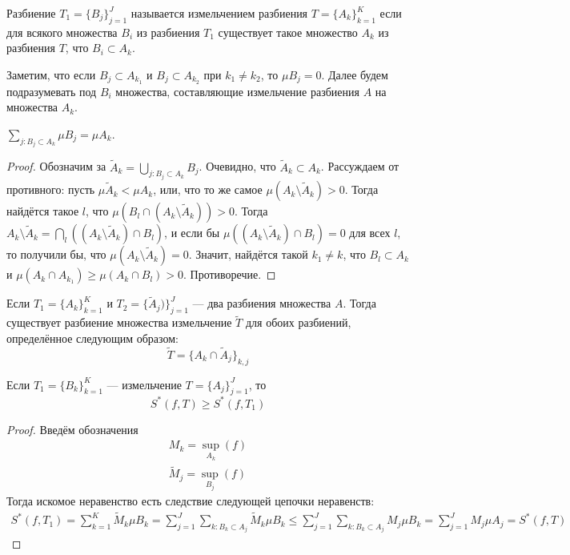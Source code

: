 \begin{Def}
    Разбиение $T_1 = \{B_j\}_{j =1}^{J}$ называется измельчением разбиения $T = \{A_k\}_{k=1}^{K}$ если для всякого множества $B_i$ из разбиения $T_1$ существует такое множество $A_k$ из разбиения $T$, что $B_i \subset A_k$. 
\end{Def}
Заметим, что если $B_j \subset A_{k_1}$ и $B_j \subset A_{k_2}$ при $k_1 \neq k_2$, то $\mu B_j = 0$. Далее будем подразумевать под $B_i$ множества, составляющие измельчение разбиения $A$ на множества $A_k$. 
\begin{Statement}
    $\sum \limits_{j\colon B_j \subset A_k}\mu B_j = \mu A_k$.
\end{Statement}
\begin{proof}
    Обозначим за $\widetilde{A}_k = \bigcup\limits_{j\colon B_j \subset A_k}B_j$. Очевидно, что $\widetilde{A}_k \subset A_k$. Рассуждаем от противного: пусть $\mu \widetilde{A}_k < \mu A_k$, или, что то же самое $ \mu(A_k\setminus \widetilde{A}_k ) > 0$. Тогда найдётся такое $l$, что $\mu (B_l \cap (A_k \setminus \widetilde{A}_k)) > 0$. Тогда $A_k \setminus \widetilde{A}_k = \bigcap\limits_{l}((A_k \setminus \widetilde{A}_k)\cap B_l)$, и если бы $\mu((A_k \setminus \widetilde{A}_k)\cap B_l) = 0$ для всех $l$, то получили бы, что $\mu(A_k \setminus \widetilde{A}_k) = 0$. Значит, найдётся такой $k_1 \neq k$, что $B_l \subset A_k$ и $\mu(A_k \cap A_{k_1}) \geqslant \mu(A_k \cap B_l) > 0$. Противоречие.
\end{proof}
Если $T_1 = \{A_k\}_{k =1}^{K}$ и $T_2 = \{\widetilde{A}_j)\}_{j=1}^{J}$ --- два разбиения множества $A$. Тогда существует разбиение множества измельчение $\widetilde{T}$ для обоих разбиений, определённое следующим образом:
$$
    \widetilde{T} =  \{A_k \cap \widetilde{A}_j\}_{k, j}
$$
\begin{Lemma}
    Если $T_1 = \{B_k\}_{k=1}^{K}$ --- измельчение $T = \{A_j\}_{j =1}^{J}$, то 
    $$
        S^* (f, T) \geqslant S^*(f, T_1)
    $$
\end{Lemma}
\begin{proof}
    Введём обозначения
    \begin{gather}
        M_k = \sup_{A_k}(f)\\
        \widetilde{M}_j = \sup_{B_j}(f)
    \end{gather}
    Тогда искомое неравенство есть следствие следующей цепочки неравенств:
    \begin{gather}
        S^*(f, T_1) = \sum\limits_{k = 1}^{K}\widetilde{M}_k\mu B_k =  \sum\limits_{j = 1}^{J} \sum\limits_{k\colon B_k \subset A_j} \widetilde{M}_k \mu B_k \leqslant \sum\limits_{j=1}^J  \sum\limits_{k\colon B_k \subset A_j} M_j \mu B_k = \sum\limits_{j=1}^J M_j \mu A_j = S^*(f, T)
    \end{gather}
\end{proof}
